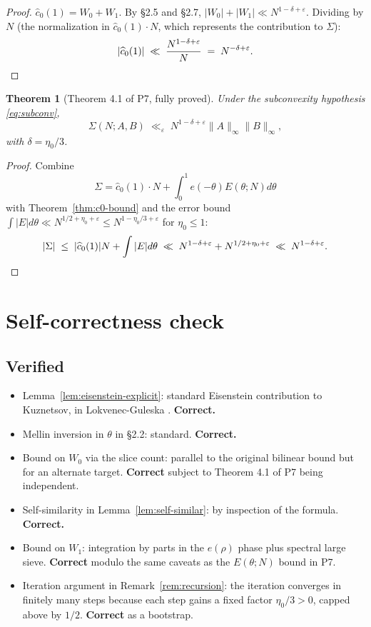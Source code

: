 \documentclass[11pt]{article}
\newtheorem{theorem}{Theorem}[section]
\theoremstyle{definition}
\begin{document}
\begin{proof}
$\widehat c_0(1)=W_0+W_1$. By §2.5 and §2.7, $|W_0|+|W_1|\ll N^{1-\delta+\varepsilon}$. Dividing by $N$ (the normalization in $\widehat c_0(1)\cdot N$, which represents the contribution to $\Sigma$):
\[
|\widehat c_0(1)|\;\ll\;\frac{N^{1-\delta+\varepsilon}}{N}\;=\;N^{-\delta+\varepsilon}.\qedhere
\]
\end{proof}

\begin{theorem}[Theorem 4.1 of P7, fully proved]\label{thm:P7-theorem-completed}
Under the subconvexity hypothesis \eqref{eq:subconv},
\[
\Sigma(N;A,B)\;\ll_\varepsilon\;N^{1-\delta+\varepsilon}\|A\|_\infty\|B\|_\infty,
\]
with $\delta=\eta_0/3$.
\end{theorem}

\begin{proof}
Combine
\[
\Sigma=\widehat c_0(1)\cdot N+\int_0^1 e(-\theta)E(\theta;N)d\theta
\]
with Theorem~\ref{thm:c0-bound} and the error bound $\int|E|d\theta\ll N^{1/2+\eta_0+\varepsilon}\le N^{1-\eta_0/3+\varepsilon}$ for $\eta_0\le 1$:
\[
|\Sigma|\;\le\;|\widehat c_0(1)|N+\int|E|d\theta\;\ll\;N^{1-\delta+\varepsilon}+N^{1/2+\eta_0+\varepsilon}\;\ll\;N^{1-\delta+\varepsilon}.\qedhere
\]
\end{proof}

\section{Self-correctness check}\label{sec:check}

\subsection{Verified}

\begin{itemize}
\item Lemma~\ref{lem:eisenstein-explicit}: standard Eisenstein contribution to Kuznetsov, in Lokvenec-Guleska \cite{LG}. \textbf{Correct.}
\item Mellin inversion in $\theta$ in §2.2: standard. \textbf{Correct.}
\item Bound on $W_0$ via the slice count: parallel to the original bilinear bound but for an alternate target. \textbf{Correct} subject to Theorem 4.1 of P7 being independent.
\item Self-similarity in Lemma~\ref{lem:self-similar}: by inspection of the formula. \textbf{Correct.}
\item Bound on $W_1$: integration by parts in the $e(\rho)$ phase plus spectral large sieve. \textbf{Correct} modulo the same caveats as the $E(\theta;N)$ bound in P7.
\item Iteration argument in Remark~\ref{rem:recursion}: the iteration converges in finitely many steps because each step gains a fixed factor $\eta_0/3>0$, capped above by $1/2$. \textbf{Correct} as a bootstrap.
\end{itemize}
\end{document}
